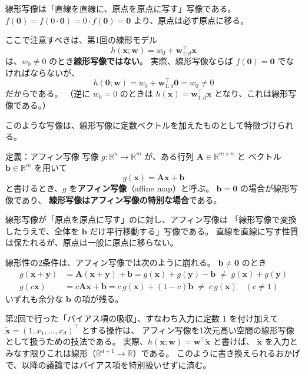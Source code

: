 線形写像は「直線を直線に、原点を原点に写す」写像である。
$f(\bm{0}) = f(0 \cdot \bm{0}) = 0 \cdot f(\bm{0}) = \bm{0}$ より、原点は必ず原点に移る。

ここで注意すべきは、第1回の線形モデル
\begin{equation}
  h(\bm{x}; \bm{w}) = w_0 + \bm{w}_{1:d}^\top \bm{x}
\end{equation}
は、$w_0 \neq 0$ のとき\textbf{線形写像ではない}。
実際、線形写像ならば $f(\bm{0}) = \bm{0}$ でなければならないが、
\begin{equation}
  h(\bm{0}; \bm{w}) = w_0 + \bm{w}_{1:d}^\top \bm{0} = w_0 \neq 0
\end{equation}
だからである。
（逆に $w_0 = 0$ のときは $h(\bm{x}) = \bm{w}_{1:d}^\top \bm{x}$ となり、これは線形写像である。）

このような写像は、線形写像に定数ベクトルを加えたものとして特徴づけられる。

\begin{itembox}[l]{定義：アフィン写像}
写像 $g : \mathbb{R}^n \to \mathbb{R}^m$ が、ある行列 $\bm{A} \in \mathbb{R}^{m \times n}$ と
ベクトル $\bm{b} \in \mathbb{R}^m$ を用いて
\begin{equation}
  g(\bm{x}) = \bm{A}\bm{x} + \bm{b}
\end{equation}
と書けるとき、$g$ を\textbf{アフィン写像}（affine map）と呼ぶ。
$\bm{b} = \bm{0}$ の場合が線形写像であり、
\textbf{線形写像はアフィン写像の特別な場合}である。
\end{itembox}

線形写像が「原点を原点に写す」のに対し、アフィン写像は
「線形写像で変換したうえで、全体を $\bm{b}$ だけ平行移動する」写像である。
直線を直線に写す性質は保たれるが、原点は一般に原点に移らない。

線形性の2条件は、アフィン写像では次のように崩れる。
$\bm{b} \neq \bm{0}$ のとき
\begin{align}
  g(\bm{x} + \bm{y}) &= \bm{A}(\bm{x} + \bm{y}) + \bm{b}
    = g(\bm{x}) + g(\bm{y}) - \bm{b} \;\neq\; g(\bm{x}) + g(\bm{y}) \\
  g(c\bm{x}) &= c\bm{A}\bm{x} + \bm{b}
    = c\, g(\bm{x}) + (1 - c)\bm{b} \;\neq\; c\, g(\bm{x}) \quad (c \neq 1)
\end{align}
いずれも余分な $\bm{b}$ の項が残る。

第2回で行った「バイアス項の吸収」、すなわち入力に定数 $1$ を付け加えて
$\tilde{\bm{x}} = (1, x_1, \ldots, x_d)^\top$ とする操作は、
アフィン写像を1次元高い空間の線形写像として扱うための技法である。
実際、$h(\bm{x}; \bm{w}) = \bm{w}^\top \tilde{\bm{x}}$ と書けば、
$\tilde{\bm{x}}$ を入力とみなす限りこれは線形（$\mathbb{R}^{d+1} \to \mathbb{R}$）である。
このように書き換えられるおかげで、以降の議論ではバイアス項を特別扱いせずに済む。


